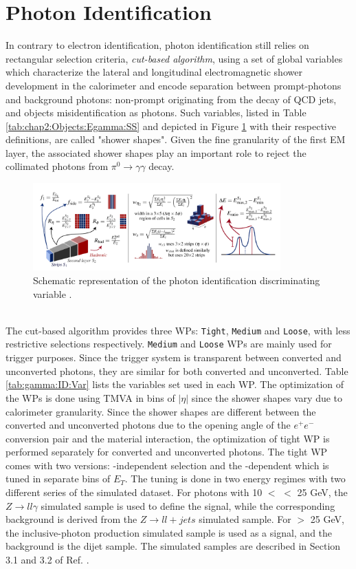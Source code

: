 \section{Photon Identification}
\label{gamma:ID}
In contrary to electron identification, photon identification still relies on rectangular selection criteria, \textit{cut-based algorithm}, using a set of global variables which characterize the lateral and longitudinal electromagnetic shower development in the calorimeter and encode separation between prompt-photons and background photons: non-prompt originating from the decay of QCD jets, and objects misidentification as photons. Such variables, listed in Table \ref{tab:chap2:Objects:Egamma:SS} and depicted in Figure \ref{fig:gamma:ID:SS} with their respective definitions, are called "shower shapes". Given the fine granularity of the first EM layer, the associated shower shapes play an important role to reject the collimated photons from $\pi^{0} \rightarrow\gamma\gamma$ decay. \\ 
\begin{figure}[htbp]
    \centering
    \includegraphics[width=0.85\textwidth]{Ch3/Img/ShowerShapes.png}
    \caption{Schematic representation of the photon identification discriminating variable \cite{ShowerShapes_fig}.}
    \label{fig:gamma:ID:SS}
\end{figure}
\\
The cut-based algorithm provides three WPs: \texttt{Tight}, \texttt{Medium} and \texttt{Loose}, with less restrictive selections respectively. \texttt{Medium} and \texttt{Loose} WPs are mainly used for trigger purposes. Since the trigger system is transparent between converted and unconverted photons, they are similar for both converted and unconverted. Table \ref{tab:gamma:ID:Var} lists the variables set used in each WP. The optimization of the WPs is done using TMVA \cite{TMVA} in bins of $|\eta|$ since the shower shapes vary due to calorimeter granularity. Since the shower shapes are different between the converted and unconverted photons due to the opening angle of the $e^+e^-$ conversion pair and the material interaction, the optimization of tight WP is performed separately for converted and unconverted photons. The tight WP comes with two versions: \eT-independent selection and the \eT-dependent which is tuned in separate bins of $E_T$. The tuning is done in two energy regimes with two different series of the simulated dataset. For photons with 10 $<$ \eT $<$ 25 GeV, the $Z\rightarrow ll\gamma$ simulated sample is used to define the signal, while the corresponding background is derived from the $Z\rightarrow ll+jets$ simulated sample. For \eT $>$ 25 GeV, the inclusive-photon production simulated sample is used as a signal, and the background is the dijet sample. The simulated samples are described in Section 3.1 and 3.2 of Ref. \cite{Egamma_Perf_2017}.   
